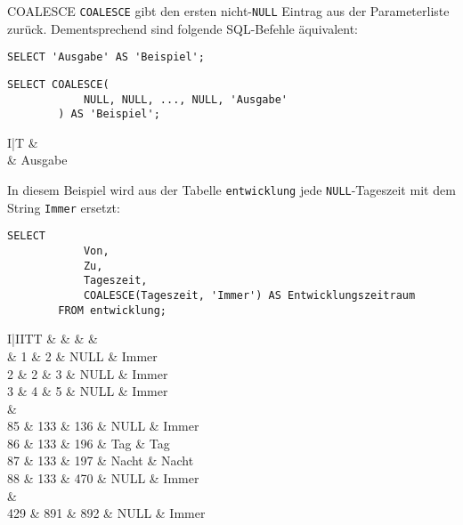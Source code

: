 \begin{sql}{COALESCE}
    \texttt{COALESCE} gibt den ersten nicht-\texttt{NULL} Eintrag aus der Parameterliste zurück.
    Dementsprechend sind folgende SQL-Befehle äquivalent:

    \begin{lstlisting}[style=SqlInputStyle]
        SELECT 'Ausgabe' AS 'Beispiel';
    \end{lstlisting}

    \begin{lstlisting}[style=SqlInputStyle]
        SELECT COALESCE(
            NULL, NULL, ..., NULL, 'Ausgabe'
        ) AS 'Beispiel';
    \end{lstlisting}

    \begin{tabular}{I|T}
        &  \\ & Ausgabe \\
    \end{tabular}

    In diesem Beispiel wird aus der Tabelle \texttt{entwicklung} jede \texttt{NULL}-Tageszeit mit dem String \texttt{Immer} ersetzt:

    \begin{lstlisting}[style=SqlInputStyle]
        SELECT
            Von,
            Zu,
            Tageszeit,
            COALESCE(Tageszeit, 'Immer') AS Entwicklungszeitraum
        FROM entwicklung;
    \end{lstlisting}

    \begin{tabular}{I|IITT}
        &  &  &  &  \\ & 1 & 2 & NULL & Immer \\
        2 & 2 & 3 & NULL & Immer \\
        3 & 4 & 5 & NULL & Immer \\
         &  \\
        85 & 133 & 136 & NULL & Immer \\
        86 & 133 & 196 & Tag & Tag \\
        87 & 133 & 197 & Nacht & Nacht \\
        88 & 133 & 470 & NULL & Immer \\
         &  \\
        429 & 891 & 892 & NULL & Immer \\
    \end{tabular}
    \setcounter{rownum}{0}
\end{sql}

